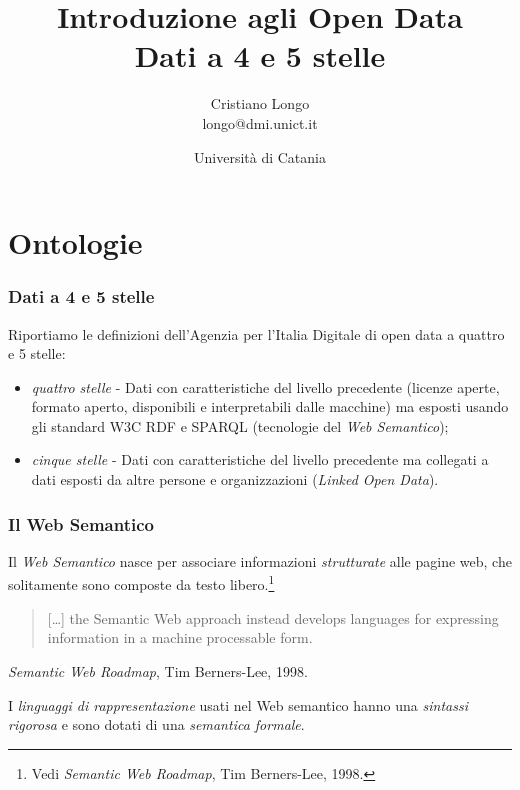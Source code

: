 \documentclass[8pt]{beamer}
\title{Introduzione agli Open Data\\
Dati a 4 e 5 stelle}
\author{Cristiano Longo\\ 
{\small{longo@dmi.unict.it}}}
\date{Universit\`a di Catania}
\begin{document}
\maketitle
\setcounter{tocdepth}{1}

\section{Ontologie}

\begin{frame}
 \frametitle{Dati a 4 e 5 stelle}
 Riportiamo le definizioni dell'Agenzia per l'Italia Digitale di open data
 a quattro e 5 stelle:
 \begin{itemize}[<+->]
  \item \emph{quattro stelle} - Dati con caratteristiche del livello precedente (licenze aperte, 
  formato aperto, disponibili e interpretabili dalle macchine) ma esposti usando gli standard
  W3C RDF e SPARQL (tecnologie del \emph{Web Semantico});
  \item \emph{cinque stelle} - Dati con caratteristiche del livello precedente ma collegati a 
  dati esposti da altre persone e organizzazioni (\emph{Linked Open Data}).
 \end{itemize}
\end{frame}

\begin{frame}
 \frametitle{Il Web Semantico}
 
 Il \emph{Web Semantico} nasce per associare informazioni 
 \emph{strutturate} alle pagine web, che solitamente sono
 composte da testo libero.\footnote{Vedi \emph{Semantic Web Roadmap}, Tim Berners-Lee, 1998.}
 \vspace{\baselineskip}
 
 \begin{quote}
    [\ldots] the Semantic Web approach instead develops languages for expressing
    information in a machine processable form. 
 \end{quote} 
    \emph{Semantic Web Roadmap}, Tim Berners-Lee, 1998.
 \vspace{\baselineskip}
    
 I \emph{linguaggi di rappresentazione} usati nel Web semantico 
 hanno una \emph{sintassi rigorosa} e sono dotati di una \emph{semantica formale}.
\end{frame}
\end{document}
